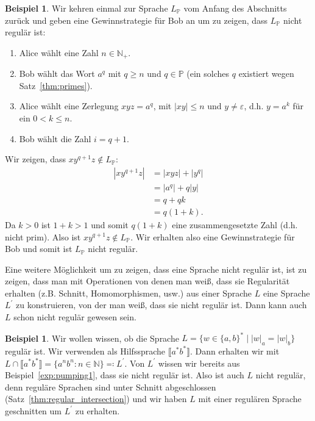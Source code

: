 \documentclass[11pt, a4paper]{article}
\theoremstyle{definition}
\newtheorem{example}[definition]{Beispiel}
\newtheorem*{example*}{Beispiel}
\theoremstyle{plain}
\numberwithin{equation}{section}
\begin{document}
\begin{example*}
	Wir kehren einmal zur Sprache $L_\mathbb{P}$ vom Anfang des Abschnitts zurück und geben eine Gewinnstrategie für Bob an um zu zeigen, dass $L_\mathbb{P}$ nicht regulär ist:
	\begin{enumerate}[label=\arabic*)]
	\item Alice wählt eine Zahl $n \in \mathbb{N}_+$.
	\item Bob wählt das Wort $a^q$ mit $q \geq n$ und $q \in \mathbb{P}$ (ein solches $q$ existiert wegen Satz~\ref{thm:primes}).
	\item Alice wählt eine Zerlegung $xyz = a^q$, mit $|xy| \leq n$ und $y \neq \varepsilon$, d.h. $y = a^k$ für ein $0 < k \leq n$.
	\item Bob wählt die Zahl $i = q+1$.
\end{enumerate}
Wir zeigen, dass $xy^{q+1}z \notin L_\mathbb{P}$:
\begin{align*}
	|xy^{q+1}z| &= |xyz| + |y^q|\\
	&= |a^q| + q |y|\\
	&= q + qk\\
	&= q(1 + k).
\end{align*}
Da $k > 0$ ist $1+k > 1$ und somit $q(1+k)$ eine zusammengesetzte Zahl (d.h. nicht prim). Also ist $xy^{q+1}z \notin L_\mathbb{P}$. Wir erhalten also eine Gewinnstrategie für Bob und somit ist $L_\mathbb{P}$ nicht regulär.
\end{example*}
Eine weitere Möglichkeit um zu zeigen, dass eine Sprache nicht regulär ist, ist zu zeigen, dass man mit Operationen von denen man weiß, dass sie Regularität erhalten (z.B. Schnitt, Homomorphismen, usw.) aus einer Sprache $L$ eine Sprache $L^\prime$ zu konstruieren, von der man weiß, dass sie nicht regulär ist. Dann kann auch $L$ schon nicht regulär gewesen sein.
\begin{example}
	Wir wollen wissen, ob die Sprache $L = \{w \in \{a, b\}^\ast \mid |w|_a = |w|_b\}$ regulär ist. Wir verwenden als Hilfssprache $\llbracket a^\ast b^\ast \rrbracket$. Dann erhalten wir mit $L \cap \llbracket a^\ast b^\ast \rrbracket = \{a^n b^n : n \in \mathbb{N}\} \eqqcolon L^\prime$. Von $L^\prime$ wissen wir bereits aus Beispiel~\ref{exp:pumping1}, dass sie nicht regulär ist. Also ist auch $L$ nicht regulär, denn reguläre Sprachen sind unter Schnitt abgeschlossen (Satz~\ref{thm:regular_intersection}) und wir haben $L$ mit einer regulären Sprache geschnitten um $L^\prime$ zu erhalten.
\end{example}
\end{document}
